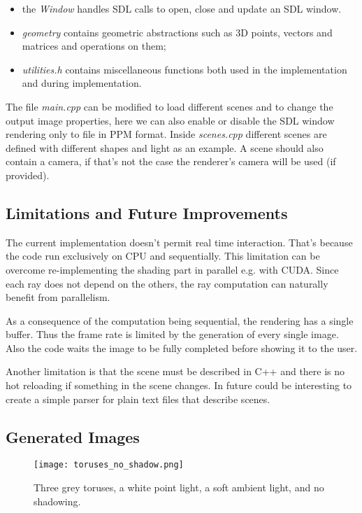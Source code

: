 \begin{itemize}
  \item the \emph{Window} handles SDL calls to open, close and update an SDL window.

  \item \emph{geometry} contains geometric abstractions such as 3D points, vectors and matrices and operations on them;
  \item \emph{utilities.h} contains miscellaneous functions both used in the implementation and during implementation.
\end{itemize}
The file \emph{main.cpp} can be modified to load different scenes and to change the output image properties, here we can also enable or disable the SDL window rendering only to file in PPM format.
Inside \emph{scenes.cpp} different scenes are defined with different shapes and light as an example.
A scene should also contain a camera, if that's not the case the renderer's camera will be used (if provided).


\subsection{Limitations and Future Improvements}
The current implementation doesn't permit real time interaction.
That's because the code run exclusively on CPU and sequentially.
This limitation can be overcome re-implementing the shading part in parallel e.g. with CUDA.
Since each ray does not depend on the others, the ray computation can naturally benefit from parallelism.

As a consequence of the computation being sequential, the rendering has a single buffer.
Thus the frame rate is limited by the generation of every single image.
Also the code waits the image to be fully completed before showing it to the user.

Another limitation is that the scene must be described in C++ and there is no hot reloading if something in the scene changes.
In future could be interesting to create a simple parser for plain text files that describe scenes.

\clearpage
\subsection{Generated Images}

\begin{figure}[!htb]
  \centering
  \texttt{[image: toruses\_no\_shadow.png]}
  \caption{Three grey toruses, a white point light, a soft ambient light, and no shadowing.}
  \label{fig:toruses_no_shadow}
\end{figure}

